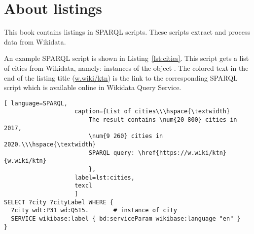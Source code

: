 
\section{About listings}

This book contains listings in SPARQL scripts.
These scripts extract and process data from Wikidata.%

An example SPARQL script is shown in Listing~\ref{lst:cities}. 
This script gets a list of cities from Wikidata, 
namely: instances of the object .
The colored text in the end of the listing title 
(\href{https://w.wiki/ktn}{w.wiki/ktn})
is the link to the corresponding SPARQL script 
which is available online in Wikidata Query Service. 



\begin{lstlisting}[ language=SPARQL, 
                    caption={List of cities\\\hspace{\textwidth}
                        The result contains \num{20 800} cities in 2017, 
                        \num{9 260} cities in 2020.\\\hspace{\textwidth}
                        SPARQL query: \href{https://w.wiki/ktn}{w.wiki/ktn}
                        },
                    label=lst:cities,
                    texcl 
                    ]
SELECT ?city ?cityLabel WHERE { 
  ?city wdt:P31 wd:Q515.       # instance of city 
  SERVICE wikibase:label { bd:serviceParam wikibase:language "en" }
}
\end{lstlisting}%



